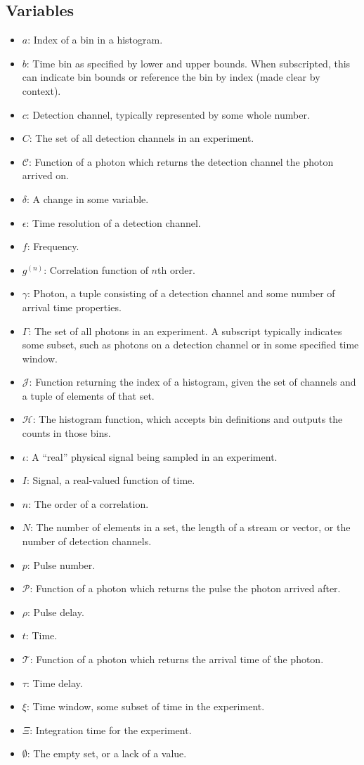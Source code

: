 \documentclass{article}
\newcommand{\gn}[1]{\ensuremath{g^{(#1)}}}
\newcommand{\channel}{\ensuremath{c}}
\newcommand{\channels}{\ensuremath{C}}
\newcommand{\Channel}{\ensuremath{\mathcal{C}}}
\newcommand{\Time}{\ensuremath{\mathcal{T}}}
\newcommand{\photon}{\ensuremath{\gamma}}
\newcommand{\photons}{\ensuremath{\Gamma}}
\newcommand{\Pulse}{\ensuremath{\mathcal{P}}}
\newcommand{\integrationtime}{\ensuremath{\Xi}}
\newcommand{\timewindow}{\ensuremath{\xi}}
\newcommand{\resolution}{\ensuremath{\epsilon}}
\newcommand{\Index}{\ensuremath{\mathcal{J}}}
\newcommand{\Histogram}{\ensuremath{\mathcal{H}}}
\begin{document}
\begin{appendix}
\subsection{Variables}
\begin{itemize}
\item $a$: Index of a bin in a histogram.
\item $b$: Time bin as specified by lower and upper bounds. When subscripted, this can indicate bin bounds or reference the bin by index (made clear by context).
\item $\channel$: Detection channel, typically represented by some whole number.
\item $\channels$: The set of all detection channels in an experiment.
\item $\Channel$: Function of a photon which returns the detection channel the photon arrived on.
\item $\delta$: A change in some variable.
\item $\resolution$: Time resolution of a detection channel.
\item $f$: Frequency.
\item $\gn{n}$: Correlation function of $n$th order.
\item $\photon$: Photon, a tuple consisting of a detection channel and some number of arrival time properties.
\item $\photons$: The set of all photons in an experiment. A subscript typically indicates some subset, such as photons on a detection channel or in some specified time window.
\item $\Index$: Function returning the index of a histogram, given the set of channels and a tuple of elements of that set.
\item $\Histogram$: The histogram function, which accepts bin definitions and outputs the counts in those bins.
\item $\iota$: A ``real'' physical signal being sampled in an experiment.
\item $I$: Signal, a real-valued function of time.
\item $n$: The order of a correlation.
\item $N$: The number of elements in a set, the length of a stream or vector, or the number of detection channels.
\item $p$: Pulse number.
\item $\Pulse$: Function of a photon which returns the pulse the photon arrived after.
\item $\rho$: Pulse delay.
\item $t$: Time.
\item $\Time$: Function of a photon which returns the arrival time of the photon.
\item $\tau$:  Time delay.
\item $\timewindow$: Time window, some subset of time in the experiment.
\item $\integrationtime$: Integration time for the experiment.
\item $\emptyset$: The empty set, or a lack of a value.
\end{itemize}


\end{appendix}
\end{document}
